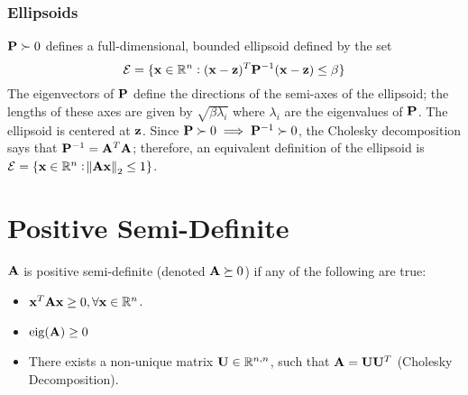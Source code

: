 \subsubsection{Ellipsoids}
$\mathbf{P}\succ0$ defines a full-dimensional, bounded ellipsoid defined by the set
\begin{equation}
\mathcal{E}=\{\mathbf{x}\in\mathbb{R}^{n}: (\mathbf{x}-\mathbf{z})^T\mathbf{P}^{-1}(\mathbf{x}-\mathbf{z})\le \beta\}
\end{equation}
The eigenvectors of $\mathbf{P}$ define the directions of the semi-axes of the ellipsoid; the lengths of these axes are given by $\sqrt{\beta\lambda_i}$ where $\lambda_i$ are the eigenvalues of $\mathbf{P}$. The ellipsoid is centered at $\mathbf{z}$. Since $\mathbf{P}\succ 0 \implies \mathbf{P}^{-1}\succ 0$, the Cholesky decomposition says that $\mathbf{P}^{-1}=\mathbf{A}^T\mathbf{A}$; therefore, an equivalent definition of the ellipsoid is $\mathcal{E}=\{\mathbf{x}\in\mathbb{R}^{n}: \norm{\mathbf{A}\mathbf{x}}_2\le1\}$.

\section{Positive Semi-Definite}

$\mathbf{A}$ is positive semi-definite (denoted $\mathbf{A}\succeq0$) if any of the following are true:
\begin{itemize}
\item $\mathbf{x}^T\mathbf{A}\mathbf{x}\ge0,\forall\mathbf{x}\in\mathbb{R}^{n}$.
\item $\operatorname{eig}(\mathbf{A})\ge0$
\item There exists a non-unique matrix $\mathbf{U}\in\mathbb{R}^{n,n}$, such that $\mathbf{A}=\mathbf{U}\mathbf{U}^T$ (Cholesky Decomposition). %
\end{itemize}


